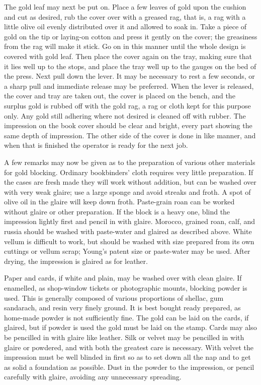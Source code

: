 \documentclass[twoside]{book}
\begin{document}
The gold leaf may next be put on. Place a few
leaves of gold upon the cushion and cut as desired,
rub the cover over with a greased rag, that is, a rag
with a little olive oil evenly distributed over it and
allowed to soak in. Take a piece of gold on the tip
or laying-on cotton and press it gently on the cover;
the greasiness from the rag will make it stick. Go
on in this manner until the whole design is covered
with gold leaf. Then place the cover again on the
tray, making sure that it lies well up to the stops,
and place the tray well up to the gauges on the bed
of the press. Next pull down the lever. It may be
necessary to rest a few seconds, or a sharp pull
and immediate release may be preferred. When the
lever is released, the cover and tray are taken out,
the cover is placed on the bench, and the surplus
gold is rubbed off with the gold rag, a rag or cloth
kept for this purpose only. Any gold still adhering
where not desired is cleaned off with rubber. The
impression on the book cover should be clear and
bright, every part showing the same depth of impression.
The other side of the cover is done in like manner,
and when that is finished the operator is ready for
the next job.

A few remarks may now be given as to the preparation
of various other materials for gold blocking.
Ordinary bookbinders' cloth requires very little
preparation. If the cases are fresh made they will
work without addition, but can be washed over
with very weak glaire; use a large sponge and
avoid streaks and froth. A spot of olive oil in the
glaire will keep down froth. Paste-grain roan can
be worked without glaire or other preparation. If
the block is a heavy one, blind the impression
lightly first and pencil in with glaire. Morocco,
grained roan, calf, and russia should be washed with
\pagebreak
paste-water and glaired as described above. White
vellum is difficult to work, but should be washed
with size prepared from its own cuttings or vellum
scrap; Young's patent size or paste-water may be
used. After drying, the impression is glaired as for
leather.

Paper and cards, if white and plain, may be
washed over with clean glaire. If enamelled, as
shop-window tickets or photographic mounts, blocking
powder is used. This is generally composed of
various proportions of shellac, gum sandarach, and
resin very finely ground. It is best bought ready
prepared, as home-made powder is not sufficiently
fine. The gold can be laid on the cards, if glaired,
but if powder is used the gold must be laid on the
stamp. Cards may also be pencilled in with glaire
like leather. Silk or velvet may be pencilled in
with glaire or powdered, and with both the greatest
care is necessary. With velvet the impression must
be well blinded in first so as to set down all the nap
and to get as solid a foundation as possible. Dust
in the powder to the impression, or pencil carefully
with glaire, avoiding any unnecessary spreading.
\end{document}

